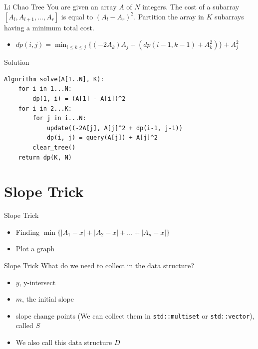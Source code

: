 \documentclass[aspectratio=169,xcolor=dvipsnames]{beamer}
\begin{document}
\begin{frame}{Li Chao Tree}
You are given an array $A$ of $N$ integers. The cost of a subarray $[A_l, A_{l+1}, ..., A_r]$ is equal to $(A_l - A_r)^2$. Partition the array in $K$ subarrays having a minimum total cost.
\begin{itemize}
    \item $dp(i, j) = \displaystyle\min_{i\leq k\leq j}\{(-2A_k)A_j + (dp(i-1, k-1) + A_k^2)\} + A_j^2$
\end{itemize}
\begin{block}{Solution}
\begin{verbatim}
Algorithm solve(A[1..N], K): 
    for i in 1...N:
        dp(1, i) = (A[1] - A[i])^2
    for i in 2...K:
        for j in i...N:
            update((-2A[j], A[j]^2 + dp(i-1, j-1))
            dp(i, j) = query(A[j]) + A[j]^2
        clear_tree()
    return dp(K, N)
\end{verbatim}
\end{block}
\end{frame}



\section{Slope Trick}
\begin{frame}[t, plain]{Slope Trick}
\begin{itemize}
    \item Finding $\min\{|A_1 - x| + |A_2 - x| + ... + |A_n - x|\}$
    \pause
    \item Plot a graph
\end{itemize}
\end{frame}

\begin{frame}[t, plain]{Slope Trick}
What do we need to collect in the data structure?
\pause
\begin{itemize}
    \item $y$, y-intersect
    \pause 
    \item $m$, the initial slope
    \pause
    \item slope change points (We can collect them in \texttt{std::multiset} or \texttt{std::vector}), called $S$
    \pause
    \item We also call this data structure $D$
\end{itemize}
\end{frame}
\end{document}

